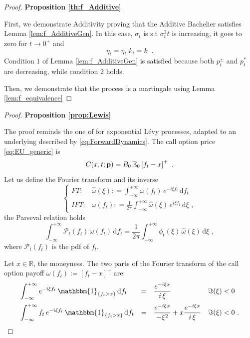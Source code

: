 \documentclass[12pt]{article}
\theoremstyle{definition}
\theoremstyle{remark}
\numberwithin{theorem}{section}
\numberwithin{proposition}{section}
\numberwithin{lemma}{section}
\numberwithin{corollary}{section}
\numberwithin{definition}{section}
\numberwithin{remark}{section}
\numberwithin{example}{section}
\newcommand{\E}{\mathbb{E}}
\newcommand{\R}{\mathbb{R}}
\begin{document}
\smallskip

\begin{proof} {\bf Proposition \ref{th:f_Additive}} 

First, we demonstrate Additivity proving that the Additive Bachelier satisfies Lemma \ref{lem:f_AdditiveGen}.
In this case, $\sigma_t$ is s.t $\sigma_t^2 t$ is increasing, it goes to zero for $t\rightarrow0^+$ and
\[
\eta_t = \eta, \, k_t = k \;\; .
\]
Condition $1$ of Lemma \ref{lem:f_AdditiveGen} is satisfied because both $p^\pm_t$ and $p^*_t$ are decreasing, while condition $2$ holds. 

Then, we demonstrate that the process is a martingale using Lemma \ref{lem:f_equivalence}
\end{proof}

\smallskip

\begin{proof}  {\bf  Proposition \ref{prop:Lewis} }

The proof reminds the one of \citet{lewis2001} for exponential L\'evy processes, adapted to an underlying described by \eqref{eq:ForwardDynamics}.
The call option price \eqref{eq:EU_generic} is
\[
C(x,t; {\bf p}) = B_0 \, \E_0 \left[  f_t -  x \right]^+ \,\,.
\]
Let us define the Fourier transform and its inverse 
\[
\left\{
\begin{array}{rl}
FT: & \hat{\omega}(\xi) : = \displaystyle \int^{+\infty}_{- \infty}\omega(f_t) \, e^{-i \xi f_t}\, \mathrm{d} f_t \\[4mm]
IFT: & \omega(f_t) : =  \displaystyle  \frac{1}{2 \pi} \int^{+\infty}_{- \infty} \hat{\omega}(\xi) \, e^{i \xi f_t}\, \mathrm{d} \xi \,\,,
\end{array}
\right.
\]
the Parseval relation holds
\[
\int^{+\infty}_{- \infty}\mathcal{P}_t(f_t) \, \omega(f_t) \, \mathrm{d} f_t= \frac{1}{2 \pi} \int^{+\infty}_{- \infty} \phi_t(\xi) \, \hat{\omega}(\xi) \,  \mathrm{d} \xi\,\,,
\]
where $\mathcal{P}_t(f_t)$ is the pdf of $f_t$.
\smallskip

Let $x \in \R$, the moneyness.
The two parts of the Fourier transform of the call option payoff $  \omega(f_t)  := [f_t  -  x]^+$ are:
\[
\begin{array}{lcll}
 \displaystyle \int^{+\infty}_{- \infty} e^{-i \xi f_t} \,  \mathbbm{1}_{\{f_t > x\}}\, \mathrm{d} f_t  & = &   \displaystyle  \frac{e^{-i \xi x}}{i \, \xi} & \Im(\xi) < 0 \\[4mm]
 \displaystyle \int^{+\infty}_{- \infty} f_t \,  e^{-i \xi f_t} \,  \mathbbm{1}_{\{f_t > x\}} \, \mathrm{d} f_t & = &   \displaystyle \frac{e^{-i \xi x}}{- \xi^2} + x  \frac{e^{-i \xi x}}{i \, \xi} & \Im(\xi) < 0 \,\,.\\
\end{array}
\]


\end{proof}
\end{document}
